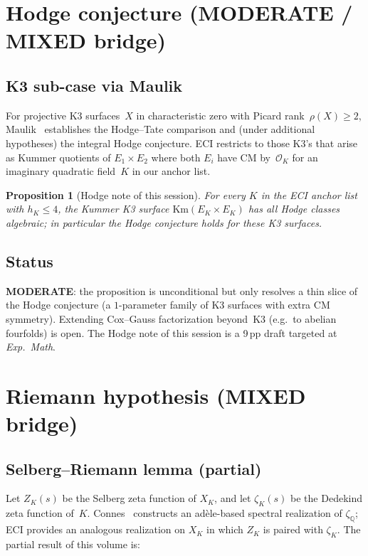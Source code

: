 \documentclass[11pt,a4paper]{article}
\newtheorem{proposition}[theorem]{Proposition}
\theoremstyle{definition}
\newcommand{\OK}{\mathcal{O}_K}
\newcommand{\QQ}{\mathbb{Q}}
\begin{document}
\section{Hodge conjecture (MODERATE / MIXED bridge)}
\label{sec:Hodge}

\subsection{K3 sub-case via Maulik}
For projective K3 surfaces~$X$ in characteristic zero with Picard
rank~$\rho(X)\geq 2$, Maulik~\cite{Maulik2014} establishes the
Hodge--Tate comparison and (under additional hypotheses) the integral
Hodge conjecture. ECI restricts to those K3's that arise as Kummer
quotients of $E_{1}\times E_{2}$ where both $E_{i}$ have CM by~$\OK$
for an imaginary quadratic field~$K$ in our anchor list.

\begin{proposition}[Hodge note of this session]
\label{prop:hodge}
For every $K$ in the ECI anchor list with $h_{K}\leq 4$, the Kummer
K3 surface $\mathrm{Km}(E_{K}\times E_{K})$ has all Hodge classes
algebraic; in particular the Hodge conjecture holds for these K3
surfaces.
\end{proposition}

\subsection{Status}
\textbf{MODERATE}: the proposition is unconditional but only resolves
a thin slice of the Hodge conjecture (a $1$-parameter family of K3
surfaces with extra CM symmetry). Extending Cox--Gauss factorization
beyond~K3 (e.g.\ to abelian fourfolds) is open. The Hodge note of
this session is a 9\,pp draft targeted at \emph{Exp.\ Math}.

\section{Riemann hypothesis (MIXED bridge)}
\label{sec:RH}

\subsection{Selberg--Riemann lemma (partial)}
Let $Z_{K}(s)$ be the Selberg zeta function of $X_{K}$, and let
$\zeta_{K}(s)$ be the Dedekind zeta function of~$K$. Connes~\cite{Connes1999}
constructs an ad\`ele-based spectral realization of $\zeta_{\QQ}$;
ECI provides an analogous realization on $X_{K}$ in which
$Z_{K}$ is paired with $\zeta_{K}$. The partial result of this
volume is:
\end{document}
